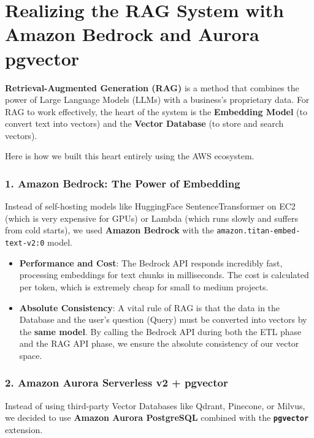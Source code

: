 \hypertarget{realizing-the-rag-system-with-amazon-bedrock-and-aurora-pgvector}{%
\section{Realizing the RAG System with Amazon Bedrock and Aurora
pgvector}}

\textbf{Retrieval-Augmented Generation (RAG)} is a method that combines
the power of Large Language Models (LLMs) with a business's proprietary
data. For RAG to work effectively, the heart of the system is the
\textbf{Embedding Model} (to convert text into vectors) and the
\textbf{Vector Database} (to store and search vectors).

Here is how we built this heart entirely using the AWS ecosystem.

\hypertarget{amazon-bedrock-the-power-of-embedding}{%
\subsubsection{1. Amazon Bedrock: The Power of
Embedding}}

Instead of self-hosting models like HuggingFace SentenceTransformer on
EC2 (which is very expensive for GPUs) or Lambda (which runs slowly and
suffers from cold starts), we used \textbf{Amazon Bedrock} with the
\texttt{amazon.titan-embed-text-v2:0} model.

\begin{itemize}
\tightlist
\item
  \textbf{Performance and Cost}: The Bedrock API responds incredibly
  fast, processing embeddings for text chunks in milliseconds. The cost
  is calculated per token, which is extremely cheap for small to medium
  projects.
\item
  \textbf{Absolute Consistency}: A vital rule of RAG is that the data in
  the Database and the user's question (Query) must be converted into
  vectors by the \textbf{same model}. By calling the Bedrock API during
  both the ETL phase and the RAG API phase, we ensure the absolute
  consistency of our vector space.
\end{itemize}

\hypertarget{amazon-aurora-serverless-v2-pgvector}{%
\subsubsection{2. Amazon Aurora Serverless v2 +
pgvector}}

Instead of using third-party Vector Databases like Qdrant, Pinecone, or
Milvus, we decided to use \textbf{Amazon Aurora PostgreSQL} combined
with the \textbf{\texttt{pgvector}} extension.

